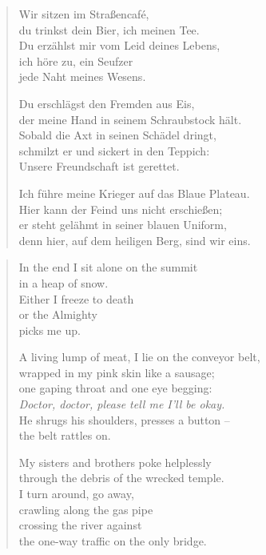{\begin{verse}
\rhytmbreak

Wir sitzen im Straßencafé,\\
du trinkst dein Bier, ich meinen Tee.\\
Du erzählst mir vom Leid deines Lebens,\\
ich höre zu, ein Seufzer\\
jede Naht meines Wesens.

\rhytmbreak

Du erschlägst den Fremden aus Eis,\\
der meine Hand in seinem Schraubstock hält.\\
Sobald die Axt in seinen Schädel dringt,\\
schmilzt er und sickert in den Teppich:\\
Unsere Freundschaft ist gerettet.

\clearpage

\rhytmbreak

Ich führe meine Krieger auf das Blaue Plateau.\\
Hier kann der Feind uns nicht erschießen;\\
er steht gelähmt in seiner blauen Uniform,\\
denn hier, auf dem heiligen Berg, sind wir eins.
\end{verse}

\clearpage


\begin{verse}
In the end I sit alone on the summit\\
in a heap of snow.\\
Either I freeze to death\\
or the Almighty\\
picks me up.

\rhytmbreak

A living lump of meat, I lie on the conveyor belt,\\
wrapped in my pink skin like a sausage;\\
one gaping throat and one eye begging:\\
\emph{Doctor, doctor, please tell me I'll be okay.}\\
He shrugs his shoulders, presses a button --\\
the belt rattles on.

\rhytmbreak

My sisters and brothers poke helplessly\\
through the debris of the wrecked temple.\\
I turn around, go away,\\
crawling along the gas pipe\\
crossing the river against\\
the one-way traffic on the only bridge.


\end{verse}}
